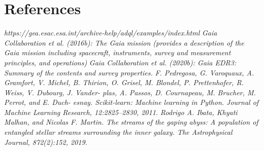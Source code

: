 \documentclass[notitlepage,nofootinbib,preprintnumbers,aps,prd]{revtex4-1}
\begin{document}
\section{References}
\begin{thebibliography}{99}

\textit{ https://gea.esac.esa.int/archive-help/adql/examples/index.html}
\textit{Gaia Collaboration et al. (2016b): The Gaia mission (provides a description of the Gaia mission including spacecraft, instruments, survey and measurement principles, and operations)}
\textit{Gaia Collaboration et al. (2020b): Gaia EDR3: Summary of the contents and survey properties.}
\textit{F. Pedregosa, G. Varoquaux, A. Gramfort, V. Michel, B. Thirion, O. Grisel, M. Blondel, P. Prettenhofer, R. Weiss, V. Dubourg, J. Vander- plas, A. Passos, D. Cournapeau, M. Brucher, M. Perrot, and E. Duch- esnay. Scikit-learn: Machine learning in Python. Journal of Machine Learning Research, 12:2825–2830, 2011.}
\textit{Rodrigo A. Ibata, Khyati Malhan, and Nicolas F. Martin. The streams of the gaping abyss: A population of entangled stellar streams surrounding the inner galaxy. The Astrophysical Journal, 872(2):152, 2019.}

\end{thebibliography}
\end{document}
